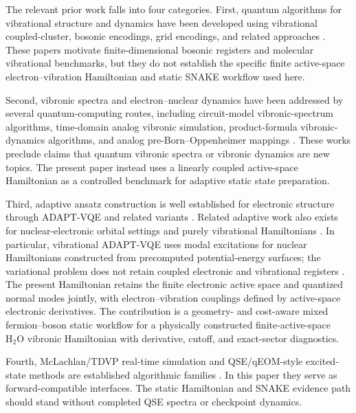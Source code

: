 \documentclass[
  reprint,
  amsmath,
  amssymb,
  aps,
  pra,
  nofootinbib,
  superscriptaddress,
  floatfix
]{revtex4-2}
\newcommand{\HtwoO}{\mathrm{H_2O}}
\begin{document}
The relevant prior work falls into four categories.  First, quantum algorithms for vibrational structure and dynamics have been developed using vibrational coupled-cluster, bosonic encodings, grid encodings, and related approaches \cite{McArdle2019Vibrations,Ollitrault2020Vibrational,Sawaya2020DLevel,LotstedtYamanouchi2026VibDynamics,Feng2026GridIR}.  These papers motivate finite-dimensional bosonic registers and molecular vibrational benchmarks, but they do not establish the specific finite active-space electron--vibration Hamiltonian and static SNAKE workflow used here.

Second, vibronic spectra and electron--nuclear dynamics have been addressed by several quantum-computing routes, including circuit-model vibronic-spectrum algorithms, time-domain analog vibronic simulation, product-formula vibronic-dynamics algorithms, and analog pre-Born--Oppenheimer mappings \cite{SawayaHuh2019Vibronic,MacDonell2023AnalogVibronic,HaMacDonell2025Analog,Li2025MSVQD}.  These works preclude claims that quantum vibronic spectra or vibronic dynamics are new topics.  The present paper instead uses a linearly coupled active-space Hamiltonian as a controlled benchmark for adaptive static state preparation.

Third, adaptive ansatz construction is well established for electronic structure through ADAPT-VQE and related variants \cite{Grimsley2019ADAPT,Tang2021QubitADAPT,Yordanov2021QEB,Anastasiou2024TETRIS}.  Related adaptive work also exists for nuclear-electronic orbital settings and purely vibrational Hamiltonians \cite{Nykanen2023NEOADAPT,Majland2024vADAPT}.  In particular, vibrational ADAPT-VQE uses modal excitations for nuclear Hamiltonians constructed from precomputed potential-energy surfaces; the variational problem does not retain coupled electronic and vibrational registers \cite{Majland2024vADAPT}.  The present Hamiltonian retains the finite electronic active space and quantized normal modes jointly, with electron--vibration couplings defined by active-space electronic derivatives.  The contribution is a geometry- and cost-aware mixed fermion--boson static workflow for a physically constructed finite-active-space \(\HtwoO\) vibronic Hamiltonian with derivative, cutoff, and exact-sector diagnostics.

Fourth, McLachlan/TDVP real-time simulation and QSE/qEOM-style excited-state methods are established algorithmic families \cite{McLachlan1964,Yuan2019VQS,Barison2021PVQD,Yao2021AVQDS,Ollitrault2020qEOM,Asthana2023qscEOM,McClean2017QSE,Colless2018QSE,Vallury2020QCM}.  In this paper they serve as forward-compatible interfaces.  The static Hamiltonian and SNAKE evidence path should stand without completed QSE spectra or checkpoint dynamics.
\end{document}
